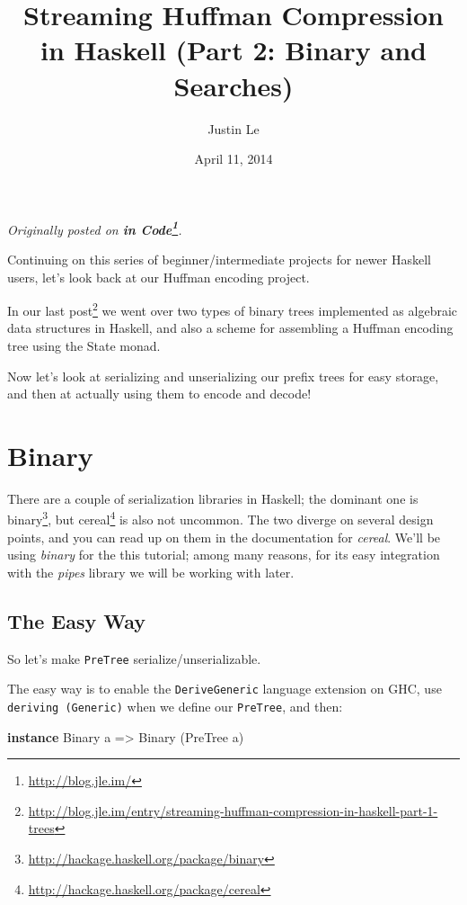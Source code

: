 \documentclass[]{article}
\title{Streaming Huffman Compression in Haskell (Part 2: Binary and Searches)}
\author{Justin Le}
\date{April 11, 2014}
\newenvironment{Shaded}{}{}
\newcommand{\KeywordTok}[1]{\textcolor[rgb]{0.00,0.44,0.13}{\textbf{{#1}}}}
\newcommand{\DataTypeTok}[1]{\textcolor[rgb]{0.56,0.13,0.00}{{#1}}}
\newcommand{\OtherTok}[1]{\textcolor[rgb]{0.00,0.44,0.13}{{#1}}}
\newcommand{\NormalTok}[1]{{#1}}
\renewcommand{\href}[2]{#2\footnote{\url{#1}}}
\begin{document}
\maketitle

\emph{Originally posted on \textbf{\href{http://blog.jle.im/}{in
Code}}.}

Continuing on this series of beginner/intermediate projects for newer
Haskell users, let's look back at our Huffman encoding project.

In our
\href{http://blog.jle.im/entry/streaming-huffman-compression-in-haskell-part-1-trees}{last
post} we went over two types of binary trees implemented as algebraic
data structures in Haskell, and also a scheme for assembling a Huffman
encoding tree using the State monad.

Now let's look at serializing and unserializing our prefix trees for
easy storage, and then at actually using them to encode and decode!

\section{Binary}\label{binary}

There are a couple of serialization libraries in Haskell; the dominant
one is \href{http://hackage.haskell.org/package/binary}{binary}, but
\href{http://hackage.haskell.org/package/cereal}{cereal} is also not
uncommon. The two diverge on several design points, and you can read up
on them in the documentation for \emph{cereal}. We'll be using
\emph{binary} for the this tutorial; among many reasons, for its easy
integration with the \emph{pipes} library we will be working with later.

\subsection{The Easy Way}\label{the-easy-way}

So let's make \texttt{PreTree} serialize/unserializable.

The easy way is to enable the \texttt{DeriveGeneric} language extension
on GHC, use \texttt{deriving\ (Generic)} when we define our
\texttt{PreTree}, and then:

\begin{Shaded}
\begin{Highlighting}[]
\KeywordTok{instance} \DataTypeTok{Binary} \NormalTok{a }\OtherTok{=>} \DataTypeTok{Binary} \NormalTok{(}\DataTypeTok{PreTree} \NormalTok{a)}
\end{Highlighting}
\end{Shaded}
\end{document}
